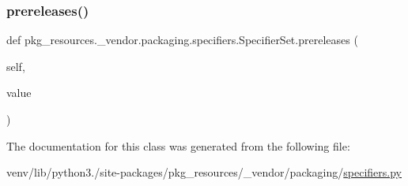 \mbox{\label{classpkg__resources_1_1__vendor_1_1packaging_1_1specifiers_1_1SpecifierSet_ad5f2f43dca1a27acc540f760d112d30f}} 
\subsubsection{\texorpdfstring{prereleases()}{prereleases()}\hspace{0.1cm}{\footnotesize\ttfamily [2/2]}}
{\footnotesize\ttfamily def pkg\+\_\+resources.\+\_\+vendor.\+packaging.\+specifiers.\+Specifier\+Set.\+prereleases (\begin{DoxyParamCaption}\item[{}]{self,  }\item[{}]{value }\end{DoxyParamCaption})}



The documentation for this class was generated from the following file\+:\begin{DoxyCompactItemize}
\item 
venv/lib/python3./site-\/packages/pkg\+\_\+resources/\+\_\+vendor/packaging/\hyperlink{pkg__resources_2__vendor_2packaging_2specifiers_8py}{specifiers.\+py}\end{DoxyCompactItemize}
